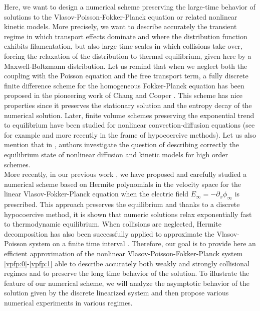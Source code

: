 \documentclass[11pt]{amsart}
\numberwithin{equation}{section}
\numberwithin{figure}{section}
\begin{document}
Here, we want to design a numerical scheme  preserving the large-time
behavior of solutions to the Vlasov-Poisson-Fokker-Planck equation or related
nonlinear kinetic models. More precisely, we want to describe
accurately the transient regime in which transport effects dominate and where the distribution function exhibits
filamentation, but also large time scales
in which collisions take over, forcing the relaxation of the distribution to thermal
equilibrium, given here by a Maxwell-Boltzmann distribution. Let us remind that
when we neglect both the coupling with the
Poisson equation and the free transport term,  a fully discrete finite difference
scheme for the homogeneous Fokker-Planck equation has been proposed in
the pioneering work of Chang and Cooper \cite{ChangCooper:1970}. This
scheme has nice properties since it preserves the stationary solution and the entropy decay of the
numerical solution. Later, finite volume schemes preserving the
exponential trend to equilibrium have been studied for nonlinear
convection-diffusion equations (see for example
\cite{Bessemoulin-Chatard2012,Burger2010,Chainais-Hillairet2007}
and more recently \cite{Georgoulis,
  Dujardin,MMT} in the frame of hypocoercive methods). Let
us also mention that in \cite{Pareschi2017}, authors investigate the
question of describing correctly the equilibrium state of nonlinear
diffusion and kinetic models for high order schemes.
\\

More recently, in our previous
work \cite{BF_09_22} , we have proposed and carefully studied a numerical scheme based
on Hermite polynomials in the velocity space for the
linear Vlasov-Fokker-Planck equation when the electric
field $E_\infty=-\partial_x\phi_\infty$ is prescribed. This approach preserves the
equilibrium and thanks to a discrete hypocoercive method, it is shown
that numeric solutions relax exponentially fast to thermodynamic equilibrium. When collisions are neglected, Hermite decomposition has also been successfully applied  to approximate the
Vlasov-Poisson system on a finite time interval \cite{Filbet2020, ref:5, bessemoulin2022cv}. Therefore, our goal is to provide here an
efficient approximation of the nonlinear Vlasov-Poisson-Fokker-Planck
system \eqref{vpfp:0}-\eqref{vpfp:1} able to describe
accurately  both weakly and strongly collisional regimes
and to preserve the long time behavior of the solution. To illustrate
the feature of our numerical scheme, we will analyze the asymptotic behavior of the
solution given by the discrete linearized system and then propose
various numerical experiments in various regimes.  
 
\end{document}
